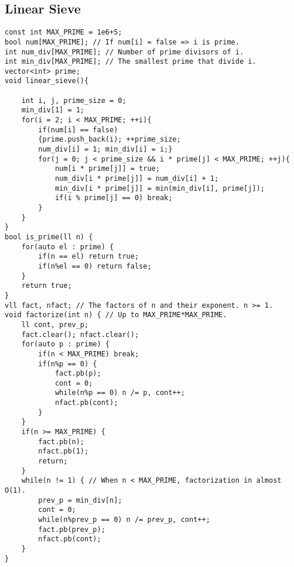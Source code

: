 \documentclass[a4paper]{article}
\begin{document}
\subsection*{Linear Sieve}
\begin{multicols}{2}
\begin{verbatim}
const int MAX_PRIME = 1e6+5;
bool num[MAX_PRIME]; // If num[i] = false => i is prime.
int num_div[MAX_PRIME]; // Number of prime divisors of i.
int min_div[MAX_PRIME]; // The smallest prime that divide i.
vector<int> prime;
void linear_sieve(){

    int i, j, prime_size = 0;
    min_div[1] = 1;
    for(i = 2; i < MAX_PRIME; ++i){
        if(num[i] == false)
        {prime.push_back(i); ++prime_size;
        num_div[i] = 1; min_div[i] = i;}
        for(j = 0; j < prime_size && i * prime[j] < MAX_PRIME; ++j){
            num[i * prime[j]] = true;
            num_div[i * prime[j]] = num_div[i] + 1;
            min_div[i * prime[j]] = min(min_div[i], prime[j]);
            if(i % prime[j] == 0) break;
        }
    }
}
bool is_prime(ll n) {
    for(auto el : prime) {
        if(n == el) return true;
        if(n%el == 0) return false;
    }
    return true;
}
vll fact, nfact; // The factors of n and their exponent. n >= 1.
void factorize(int n) { // Up to MAX_PRIME*MAX_PRIME.
    ll cont, prev_p;
    fact.clear(); nfact.clear();
    for(auto p : prime) {
        if(n < MAX_PRIME) break;
        if(n%p == 0) {
            fact.pb(p);
            cont = 0;
            while(n%p == 0) n /= p, cont++;
            nfact.pb(cont);
        }
    } 
    if(n >= MAX_PRIME) {
        fact.pb(n);
        nfact.pb(1);
        return;
    }
    while(n != 1) { // When n < MAX_PRIME, factorization in almost O(1).
        prev_p = min_div[n];
        cont = 0;
        while(n%prev_p == 0) n /= prev_p, cont++;
        fact.pb(prev_p);
        nfact.pb(cont);
    }
}
\end{verbatim}
\end{multicols}
\end{document}
